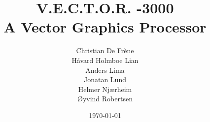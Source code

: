 \newcommand{\mytitle}{V.E.C.T.O.R. -3000 \\ \vspace{0.5cm} A Vector Graphics Processor}
\newcommand{\myauthor}{Christian De Frène\\Håvard Holmboe Lian\\Anders Lima\\Jonatan Lund\\Helmer Njærheim\\Øyvind Robertsen\\}

\title{\mytitle}
\author{\myauthor}
\date{\today}
